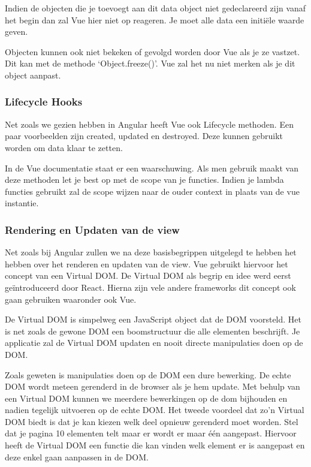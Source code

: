 Indien de objecten die je toevoegt aan dit data object niet gedeclareerd zijn vanaf het begin dan zal Vue hier niet op reageren. Je moet alle data een initiële waarde geven.

Objecten kunnen ook niet bekeken of gevolgd worden door Vue als je ze vastzet. Dit kan met de methode ‘Object.freeze()’. Vue zal het nu niet merken als je dit object aanpast.

\subsubsection{Lifecycle Hooks}
\label{sec:Vue_Lifecycle}
Net zoals we gezien hebben in Angular heeft Vue ook Lifecycle methoden. Een paar voorbeelden zijn created, updated en destroyed. Deze kunnen gebruikt worden om data klaar te zetten.

In de Vue documentatie staat er een waarschuwing. Als men gebruik maakt van deze methoden let je best op met de scope van je functies. Indien je lambda functies gebruikt zal de scope wijzen naar de ouder context in plaats van de vue instantie.

\subsubsection{Rendering en Updaten van de view}
\label{sec:Vue_Rendering_Updaten}
Net zoals bij Angular zullen we na deze basisbegrippen uitgelegd te hebben het hebben over het renderen en updaten van de view. Vue gebruikt hiervoor het concept van een Virtual DOM. De Virtual DOM als begrip en idee werd eerst geïntroduceerd door React. Hierna zijn vele andere frameworks dit concept ook gaan gebruiken waaronder ook Vue.

De Virtual DOM is simpelweg een JavaScript object dat de DOM voorsteld. Het is net zoals de gewone DOM een boomstructuur die alle elementen beschrijft. Je applicatie zal de Virtual DOM updaten en nooit directe manipulaties doen op de DOM.

Zoals geweten is manipulaties doen op de DOM een dure bewerking. De echte DOM wordt meteen gerenderd in de browser als je hem update. Met behulp van een Virtual DOM kunnen we meerdere bewerkingen op de dom bijhouden en nadien tegelijk uitvoeren op de echte DOM. Het tweede voordeel dat zo’n Virtual DOM biedt is dat je kan kiezen welk deel opnieuw gerenderd moet worden. Stel dat je pagina 10 elementen telt maar er wordt er maar één aangepast. Hiervoor heeft de Virtual DOM een functie die kan vinden welk element er is aangepast en deze enkel gaan aanpassen in de DOM.

